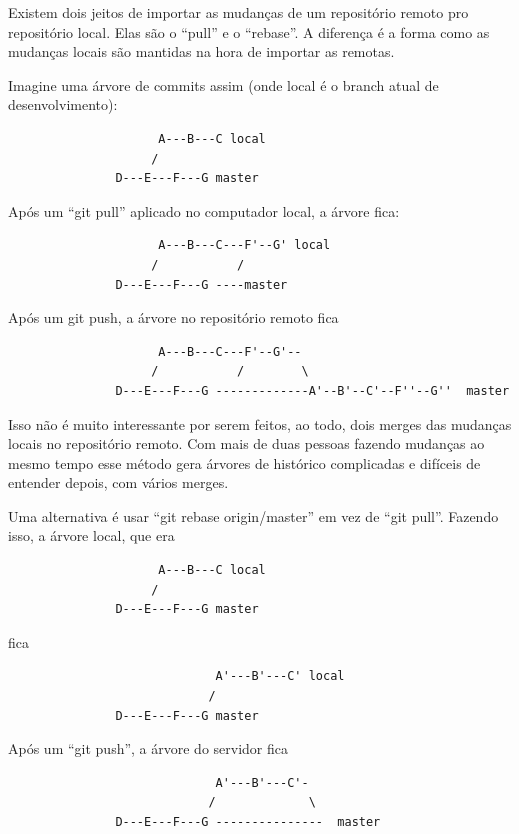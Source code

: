 \documentclass[12pt,brazil]{book}
\begin{document}
Existem dois jeitos de importar as mudanças de um repositório remoto
pro repositório local. Elas são o ``pull'' e o ``rebase''. A diferença
é a forma como as mudanças locais são mantidas na hora de importar as
remotas.

Imagine uma árvore de commits assim (onde local é o branch atual de desenvolvimento):

\begin{verbatim}
                     A---B---C local
                    /
               D---E---F---G master
\end{verbatim}

Após um ``git pull'' aplicado no computador local, a árvore fica:

\begin{verbatim}
                     A---B---C---F'--G' local
                    /           /
               D---E---F---G ----master
\end{verbatim}

Após um git push, a árvore no repositório remoto fica

\begin{verbatim}
                     A---B---C---F'--G'-- 
                    /           /        \
               D---E---F---G -------------A'--B'--C'--F''--G''  master
\end{verbatim}

Isso não é muito interessante por serem feitos, ao todo, dois merges
das mudanças locais no repositório remoto. Com mais de duas pessoas
fazendo mudanças ao mesmo tempo esse método gera árvores de histórico
complicadas e difíceis de entender depois, com vários merges.

Uma alternativa é usar ``git rebase origin/master'' em vez de ``git
pull''. Fazendo isso, a árvore local, que era

\begin{verbatim}
                     A---B---C local
                    /
               D---E---F---G master
\end{verbatim}

fica

\begin{verbatim}
                             A'---B'---C' local
                            /
               D---E---F---G master
\end{verbatim}

Após um ``git push'', a árvore do servidor fica

\begin{verbatim}
                             A'---B'---C'-
                            /             \
               D---E---F---G ---------------  master
\end{verbatim}
\end{document}
